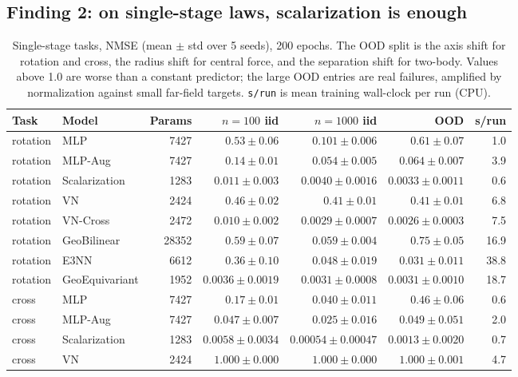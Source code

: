 \documentclass[11pt]{article}
\begin{document}
\subsection{Finding 2: on single-stage laws, scalarization is enough}

\begin{table}[t]
\centering
\caption{Single-stage tasks, NMSE (mean $\pm$ std over 5 seeds), 200 epochs.
The OOD split is the axis shift for rotation and cross, the radius shift for
central force, and the separation shift for two-body. Values above 1.0 are
worse than a constant predictor; the large OOD entries are real failures,
amplified by normalization against small far-field targets.
\texttt{s/run} is mean training wall-clock per run (CPU).}
\label{tab:simple}
\scriptsize
\begin{tabular}{llrrrrr}
\toprule
Task & Model & Params & $n{=}100$ iid & $n{=}1000$ iid & OOD & s/run \\
\midrule
rotation & MLP & 7427 & $0.53 \pm 0.06$ & $0.101 \pm 0.006$ & $0.61 \pm 0.07$ & 1.0 \\
rotation & MLP-Aug & 7427 & $0.14 \pm 0.01$ & $0.054 \pm 0.005$ & $0.064 \pm 0.007$ & 3.9 \\
rotation & Scalarization & 1283 & $0.011 \pm 0.003$ & $0.0040 \pm 0.0016$ & $0.0033 \pm 0.0011$ & 0.6 \\
rotation & VN & 2424 & $0.46 \pm 0.02$ & $0.41 \pm 0.01$ & $0.41 \pm 0.01$ & 6.8 \\
rotation & VN-Cross & 2472 & $0.010 \pm 0.002$ & $0.0029 \pm 0.0007$ & $0.0026 \pm 0.0003$ & 7.5 \\
rotation & GeoBilinear & 28352 & $0.59 \pm 0.07$ & $0.059 \pm 0.004$ & $0.75 \pm 0.05$ & 16.9 \\
rotation & E3NN & 6612 & $0.36 \pm 0.10$ & $0.048 \pm 0.019$ & $0.031 \pm 0.011$ & 38.8 \\
rotation & GeoEquivariant & 1952 & $0.0036 \pm 0.0019$ & $0.0031 \pm 0.0008$ & $0.0031 \pm 0.0010$ & 18.7 \\
\midrule
cross & MLP & 7427 & $0.17 \pm 0.01$ & $0.040 \pm 0.011$ & $0.46 \pm 0.06$ & 0.6 \\
cross & MLP-Aug & 7427 & $0.047 \pm 0.007$ & $0.025 \pm 0.016$ & $0.049 \pm 0.051$ & 2.0 \\
cross & Scalarization & 1283 & $0.0058 \pm 0.0034$ & $0.00054 \pm 0.00047$ & $0.0013 \pm 0.0020$ & 0.7 \\
cross & VN & 2424 & $1.000 \pm 0.000$ & $1.000 \pm 0.000$ & $1.000 \pm 0.001$ & 4.7 \\

\end{tabular}
\end{table}
\end{document}
